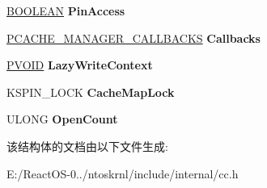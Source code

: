 \begin{DoxyCompactItemize}
\hyperlink{_processor_bind_8h_a112e3146cb38b6ee95e64d85842e380a}{B\+O\+O\+L\+E\+AN} {\bfseries Pin\+Access}
\item 
\mbox{\label{struct___r_o_s___s_h_a_r_e_d___c_a_c_h_e___m_a_p_a49f77be5dd76746a5cc0c0075953c8e1}} 
\hyperlink{struct___c_a_c_h_e___m_a_n_a_g_e_r___c_a_l_l_b_a_c_k_s}{P\+C\+A\+C\+H\+E\+\_\+\+M\+A\+N\+A\+G\+E\+R\+\_\+\+C\+A\+L\+L\+B\+A\+C\+KS} {\bfseries Callbacks}
\item 
\mbox{\label{struct___r_o_s___s_h_a_r_e_d___c_a_c_h_e___m_a_p_a7e0e5916de62975b08590aa74af65896}} 
\hyperlink{interfacevoid}{P\+V\+O\+ID} {\bfseries Lazy\+Write\+Context}
\item 
\mbox{\label{struct___r_o_s___s_h_a_r_e_d___c_a_c_h_e___m_a_p_a4391827907fd8298ffde1e0665bc88da}} 
K\+S\+P\+I\+N\+\_\+\+L\+O\+CK {\bfseries Cache\+Map\+Lock}
\item 
\mbox{\label{struct___r_o_s___s_h_a_r_e_d___c_a_c_h_e___m_a_p_a73fc0426f5711c66c0409617a71582b3}} 
U\+L\+O\+NG {\bfseries Open\+Count}
\end{DoxyCompactItemize}


该结构体的文档由以下文件生成\+:\begin{DoxyCompactItemize}
\item 
E\+:/\+React\+O\+S-\/0../ntoskrnl/include/internal/cc.\+h\end{DoxyCompactItemize}
